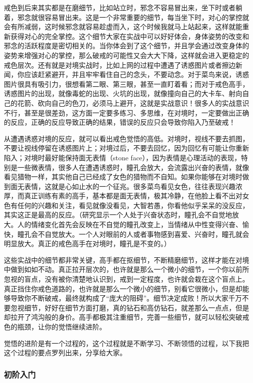 戒色到后来其实都是在磨细节，比如站立时，邪念不容易冒出来，坐下时或者躺着，邪念就很容易冒出来。这是一个非常重要的细节，每当坐下时，对心的掌控就会有所减弱，这时候邪念就容易趁虚而入，这个时候我就马上站起来，这样就能重新获得对心的完全掌控。这个细节大家在实战中可以好好体会，身体姿势的改变和邪念的活跃程度是密切相关的。当你体会到了这个细节，并且学会通过改变身体的姿势来增强对心的掌控，那么破戒的可能性又会大大下降，这样就会进入更稳定的戒色层次。还有就是对境实战时，比如上网的过程中遭遇了诱惑图片或者擦边新闻，你应该赶紧避开，并且牢牢看住自己的念头，不要动念。对于菜鸟来说，诱惑图片很具有吸引力，很想看第二眼、第三眼，甚至一直盯着看；而对于戒色高手，诱惑图片的出现，就像毒蛇的出现、火坑的出现，就像撞向自己的大卡车、射向自己的花箭、砍向自己的色刀，必须马上避开，这就是实战意识！很多人的实战意识不行，甚至是很差劲，这方面一定要多练习、多思维，在对境时，一定要做出正确的反应，正确的反应导致正确的结果，错误的反应只会导致你陷入乃至破戒！

从遭遇诱惑对境的反应，就可以看出戒色觉悟的高低。对境时，视线不要去抓图，不要让视线停留在诱惑图片上；对境过后，不要去回忆，因为回忆有可能让你重新陷入；对境时最好能保持面无表情（stone face），因为表情是心理活动的表现，特别是一些微表情，很多人在遭遇诱惑时，瞳孔会放大，会流露出兴奋的表情，就像看见猎物一样，其实他自己已经成了女色的猎物而不自知。如果你能够在对境时做到面无表情，这就是心如止水的一个征兆。很多菜鸟看见女色，往往表现兴趣浓厚，而真正训练有素的高手，基本都是面无表情，极其冷静，在他脸上看不出对女色有任何的兴趣和关注，看见就像没看见，大智若愚，你看他似乎呆呆的没反应，其实这正是最高的反应。（研究显示一个人处于兴奋状态时，瞳孔会不自觉地放大。人的情绪变化首先会反映在不自觉的瞳孔改变上，当情绪从中性变得兴奋、愉快，瞳孔会不自觉放大。一个人对眼前的人或者事物感到喜爱、兴奋时，瞳孔就会明显放大。真正的戒色高手在对境时，瞳孔是不变的。）

这些实战中的细节都非常关键，高手都在抠细节，不断精磨细节，这样才能在对境中做到如如不动。真正拉开层次的，也许就是那么一个微小的细节，一个你以前所忽视的盲点，没有被你清楚地认识到，戒到一定程度，也许就会栽在这个盲点上。真正挡住你戒色道路的，也许就是那么一个微小的细节，别看它很微小，但是却能够导致你不断破戒，最终就构成了“庞大的阻碍”。细节决定成败！所以大家千万不要忽视细节，好好在细节方面打磨，真的钻石和高仿钻石，就差那么一点点，但是却拉开了鸿沟般的身价。高手都极其注重细节，完善一些细节，就可以轻松突破戒色的瓶颈，让你的觉悟继续进阶。

觉悟的进阶是有一个过程的，这个过程就是不断学习、不断领悟的过程，以下我把这个过程的要点罗列出来，分享给大家。

\subsubsection{初阶入门}

